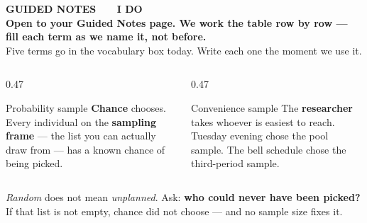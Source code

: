 \documentclass[aspectratio=169, 11pt]{beamer}
\newcommand{\redink}[1]{{\color{redacc}\bfseries #1}}
\begin{document}
{
\begin{frame}[plain]
  \vspace{1.8cm}\hspace{0.8cm}%
  \begin{minipage}{0.86\textwidth}
    {\color{goldacc}\bfseries\small GUIDED NOTES \ \textbullet\ \ I DO}\\[0.7cm]
    {\color{white}\bfseries\Large Open to your Guided Notes page. We work the table row by
    row --- fill each term as we name it, not before.}\\[0.9cm]
    {\color{frostmid}\small Five terms go in the vocabulary box today. Write each one the
    moment we use it.}
  \end{minipage}
\end{frame}
}

\begin{frame}[t, plain]
  \vspace{4pt}
  \begin{columns}[t]
    \begin{column}{0.47\textwidth}
      \begin{block}{Probability sample}
        \textbf{Chance} chooses. Every individual on the \textbf{sampling frame} --- the list
        you can actually draw from --- has a known chance of being picked.
      \end{block}
    \end{column}
    \begin{column}{0.47\textwidth}
      \begin{block}{Convenience sample}
        The \textbf{researcher} takes whoever is easiest to reach. Tuesday evening chose the
        pool sample. The bell schedule chose the third-period sample.
      \end{block}
    \end{column}
  \end{columns}
  \vspace{12pt}
  \begin{center}
    {\large \emph{Random} does not mean \emph{unplanned}. Ask: \redink{who could never have
    been picked?}}\\[6pt]
    {\small\color{slate} If that list is not empty, chance did not choose --- and no sample
    size fixes it.}
  \end{center}
\end{frame}
\end{document}
